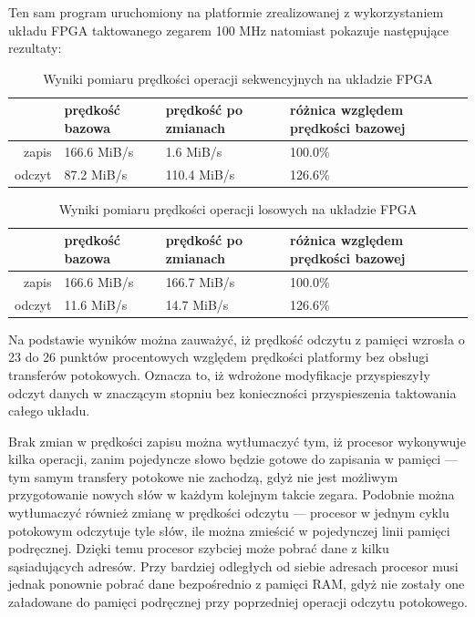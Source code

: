 Ten sam program uruchomiony na platformie zrealizowanej z wykorzystaniem układu FPGA taktowanego zegarem 100 MHz natomiast pokazuje następujące rezultaty:

\begin{table}[H]
\begin{center}
\begin{tabular}{ r|l|l|l| }
  & prędkość bazowa & prędkość po zmianach & różnica względem prędkości bazowej\\
 \hline
 zapis & 166.6 MiB/s & 1.6 MiB/s & 100.0\%\\
 odczyt & 87.2 MiB/s & 110.4 MiB/s & 126.6\%\\
 \hline
\end{tabular}
\end{center}
\caption{\label{tab:benchmark-seq-arty}Wyniki pomiaru prędkości operacji sekwencyjnych na układzie FPGA}
\end{table}

\begin{table}[H]
\begin{center}
\begin{tabular}{ r|l|l|l| }
  & prędkość bazowa & prędkość po zmianach & różnica względem prędkości bazowej\\
 \hline
 zapis & 166.6 MiB/s & 166.7 MiB/s & 100.0\%\\
 odczyt & 11.6 MiB/s & 14.7 MiB/s & 126.6\%\\
 \hline
\end{tabular}
\end{center}
\caption{\label{tab:benchmark-rnd-arty}Wyniki pomiaru prędkości operacji losowych na układzie FPGA}
\end{table}

Na podstawie wyników można zauważyć, iż prędkość odczytu z pamięci wzrosła o 23 do 26 punktów procentowych względem prędkości platformy bez obsługi transferów potokowych. Oznacza to, iż wdrożone modyfikacje przyspieszyły odczyt danych w znaczącym stopniu bez konieczności przyspieszenia taktowania całego układu.

Brak zmian w prędkości zapisu można wytłumaczyć tym, iż procesor wykonywuje kilka operacji, zanim pojedyncze słowo będzie gotowe do zapisania w pamięci --- tym samym transfery potokowe nie zachodzą, gdyż nie jest możliwym przygotowanie nowych słów w każdym kolejnym takcie zegara.
Podobnie można wytłumaczyć również zmianę w prędkości odczytu --- procesor w jednym cyklu potokowym odczytuje tyle słów, ile można zmieścić w pojedynczej linii pamięci podręcznej. Dzięki temu procesor szybciej może pobrać dane z kilku sąsiadujących adresów. Przy bardziej odległych od siebie adresach procesor musi jednak ponownie pobrać dane bezpośrednio z pamięci RAM, gdyż nie zostały one załadowane do pamięci podręcznej przy poprzedniej operacji odczytu potokowego.

